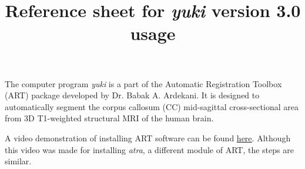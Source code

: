 \documentclass[11pt]{article}
\title{Reference sheet for {\it yuki} version 3.0 usage}
\begin{document}
\maketitle
{} 
The computer program {\it yuki} is a part of the Automatic Registration Toolbox (ART) package 
developed by Dr. Babak A. Ardekani. It is designed to automatically segment the corpus callosum
(CC) mid-sagittal cross-sectional area from 3D T1-weighted structural MRI of the human brain.


A video demonstration of installing ART software can be found
\href{https://www.youtube.com/watch?v=xCawMFQr50M\&t=26s}{\underline{here}}.
Although this video was made for installing {\it atra}, a different module of ART, 
the steps are similar.
\end{document}
